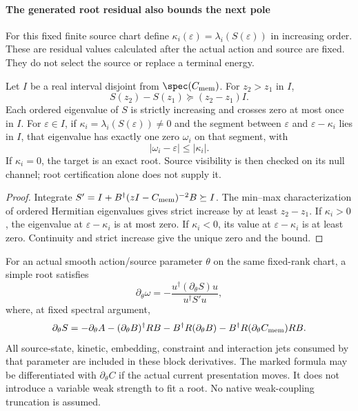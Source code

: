 \documentclass[12pt,a4paper]{article}
\begin{document}
\paragraph{The generated root residual also bounds the next pole}
For this fixed finite source chart define
$\kappa_i(\varepsilon)=\lambda_i(S(\varepsilon))$ in increasing order.
These are residual values calculated after the actual action and source
are fixed. They do not select the source or replace a terminal energy.

\begin{theorem}
\label{p4:thm:v2168-regular-gap-root-bound}
Let $I$ be a real interval disjoint from $\spec(C_{\rm mem})$. For
$z_2>z_1$ in $I$,
\[
 S(z_2)-S(z_1)\succeq(z_2-z_1)I.
\]
Each ordered eigenvalue of $S$ is strictly increasing and crosses zero
at most once in $I$. For $\varepsilon\in I$, if
$\kappa_i=\lambda_i(S(\varepsilon))\ne0$ and the segment between
$\varepsilon$ and $\varepsilon-\kappa_i$ lies in $I$, that eigenvalue
has exactly one zero $\omega_i$ on that segment, with
\[
 \boxed{|\omega_i-\varepsilon|\le|\kappa_i|.}
\]
If $\kappa_i=0$, the target is an exact root. Source visibility is then
checked on its null channel; root certification alone does not supply it.
\end{theorem}
\begin{proof}
Integrate $S'=I+B^\dagger(zI-C_{\rm mem})^{-2}B\succeq I$.
The min--max characterization of ordered Hermitian eigenvalues gives
strict increase by at least $z_2-z_1$. If $\kappa_i>0$, the eigenvalue at
$\varepsilon-\kappa_i$ is at most zero. If $\kappa_i<0$, its value at
$\varepsilon-\kappa_i$ is at least zero. Continuity and strict increase
give the unique zero and the bound.
\end{proof}

For an actual smooth action/source parameter $\theta$ on the same fixed-rank
chart, a simple root satisfies
\[
 \boxed{\partial_\theta\omega
 =-\frac{u^\dagger(\partial_\theta S)u}{u^\dagger S'u},}
\]
where, at fixed spectral argument,
\[
 \partial_\theta S
 =-\partial_\theta A-(\partial_\theta B)^\dagger RB
                   -B^\dagger R(\partial_\theta B)
                   -B^\dagger R(\partial_\theta C_{\rm mem})RB.
\]
All source-state, kinetic, embedding, constraint and interaction jets
consumed by that parameter are included in these block derivatives.
The marked formula may be differentiated with $\partial_\theta C$ if
the actual current presentation moves. It does not introduce a variable
weak strength to fit a root. No native weak-coupling truncation is assumed.
\end{document}
